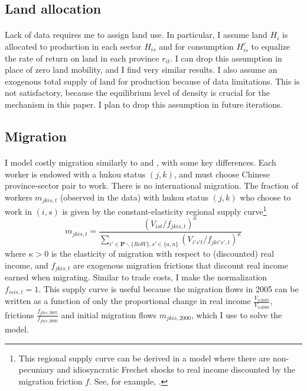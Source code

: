 \documentclass[]{article}
\theoremstyle{plain}
\begin{document}
\subsection*{Land allocation}
\paragraph*{}
Lack of data requires me to assign land use. In particular, I assume land $H_{i}$ is allocated to production in each sector $H_{is}$ and for consumption $H^{c}_{is}$ to equalize the rate of return on land in each province $r_{it}$. I can drop this assumption in place of zero land mobility, and I find very similar results. I also assume an exogenous total supply of land for production because of data limitations. This is not satisfactory, because the equilibrium level of density is crucial for the mechanism in this paper. I plan to drop this assumption in future iterations.
\subsection*{Migration}
\paragraph*{}
I model costly migration similarly to \cite{tombezhu} and \cite{hao2020}, with some key differences. Each worker is endowed with a hukou status $(j, k)$, and must choose Chinese province-sector pair to work. There is no international migration. The fraction of workers $m_{jkis, t}$ (observed in the data) with hukou status $(j, k)$ who choose to work in $(i, s)$ is given by the constant-elasticity regional supply curve\footnote{This regional supply curve can be derived in a model where there are non-pecuniary and idiosyncratic Frechet shocks to real income discounted by the migration friction $f$. See, for example, \cite{redding2016}.}
\begin{equation}\label{laboursupply}
	m_{jkis, t} = \frac{(V_{ist}/f_{jkis,t})^{\kappa}}{\sum_{i' \in \mathbf{P} \backslash \{RoW\}, s'\in \{a, n\}}(V_{i's't}/f_{jki's',t})^{\kappa}}
\end{equation}
where $\kappa > 0$ is the elasticity of migration with respect to (discounted) real income, and $f_{jkis, t}$ are exogenous migration frictions that discount real income earned when migrating. Similar to trade costs, I make the normalization $f_{isis, t} = 1$. This supply curve is useful because the migration flows in 2005 can be written as a function of only the proportional change in real income $\frac{V_{is2005}}{V_{is2000}}$, frictions $\frac{f_{jkis, 2005}}{f_{jkis, 2000}}$ and initial migration flows $m_{jkis,2000}$, which I use to solve the model.  
\end{document}
